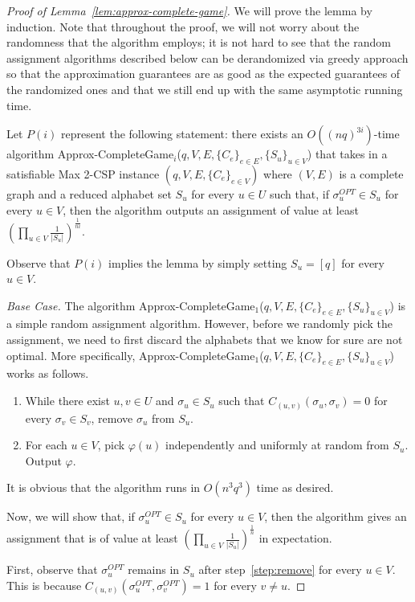 \documentclass{article}
\begin{document}
\begin{proof}[Proof of Lemma~\ref{lem:approx-complete-game}]
We will prove the lemma by induction. Note that throughout the proof, we will not worry about the randomness that the algorithm employs; it is not hard to see that the random assignment algorithms described below can be derandomized via greedy approach so that the approximation guarantees are as good as the expected guarantees of the randomized ones and that we still end up with the same asymptotic running time.

Let $P(i)$ represent the following statement: there exists an $O\left((nq)^{3i}\right)$-time algorithm {\sc Approx-CompleteGame$_i$}($q, V, E, \{C_{e}\}_{e \in E}, \{S_u\}_{u \in V}$) that takes in a satisfiable {\sc Max 2-CSP} instance $(q, V, E, \{C_{e}\}_{e \in V})$ where $(V, E)$ is a complete graph and a reduced alphabet set $S_u$ for every $u \in U$ such that, if $\sigma^{OPT}_u \in S_u$ for every $u \in V$, then the algorithm outputs an assignment of value at least $\left(\prod_{u \in V} \frac{1}{|S_u|}\right)^{\frac{1}{ni}}$.

Observe that $P(i)$ implies the lemma by simply setting $S_u = [q]$ for every $u \in V$.

{\em Base Case.} The algorithm {\sc Approx-CompleteGame$_1$}($q, V, E, \{C_{e}\}_{e \in E}, \{S_u\}_{u \in V}$) is a simple random assignment algorithm. However, before we randomly pick the assignment, we need to first discard the alphabets that we know for sure are not optimal. More specifically, {\sc Approx-CompleteGame$_1$}($q, V, E, \{C_{e}\}_{e \in E}, \{S_u\}_{u \in V}$) works as follows.
\begin{enumerate}
  \item While there exist $u, v \in U$ and $\sigma_u \in S_u$ such that $C_{(u, v)}(\sigma_u, \sigma_v) = 0$ for every $\sigma_v \in S_v$, remove $\sigma_u$ from $S_u$. \label{step:remove}
  \item For each $u \in V$, pick $\varphi(u)$ independently and uniformly at random from $S_u$. Output $\varphi$.
\end{enumerate}

It is obvious that the algorithm runs in $O(n^3q^3)$ time as desired.

Now, we will show that, if $\sigma_u^{OPT} \in S_u$ for every $u \in V$, then the algorithm gives an assignment that is of value at least $\left(\prod_{u \in V} \frac{1}{|S_u|}\right)^{\frac{1}{n}}$ in expectation.

First, observe that $\sigma_u^{OPT}$ remains in $S_u$ after step~\ref{step:remove} for every $u \in V$. This is because $C_{(u, v)}(\sigma_u^{OPT}, \sigma_v^{OPT}) = 1$ for every $v \neq u$.


\end{proof}
\end{document}
